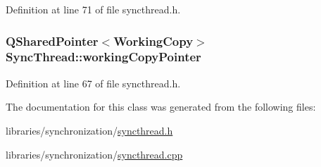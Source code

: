 Definition at line 71 of file syncthread.h.

\hypertarget{class_sync_thread_a73bbe84d7d531f2e6e728d5ade881270}{
\subsubsection[{workingCopyPointer}]{\setlength{\rightskip}{0pt plus 5cm}QSharedPointer$<${\bf WorkingCopy}$>$ {\bf SyncThread::workingCopyPointer}}}
\label{class_sync_thread_a73bbe84d7d531f2e6e728d5ade881270}


Definition at line 67 of file syncthread.h.



The documentation for this class was generated from the following files:\begin{DoxyCompactItemize}
\item 
libraries/synchronization/\hyperlink{syncthread_8h}{syncthread.h}\item 
libraries/synchronization/\hyperlink{syncthread_8cpp}{syncthread.cpp}\end{DoxyCompactItemize}
